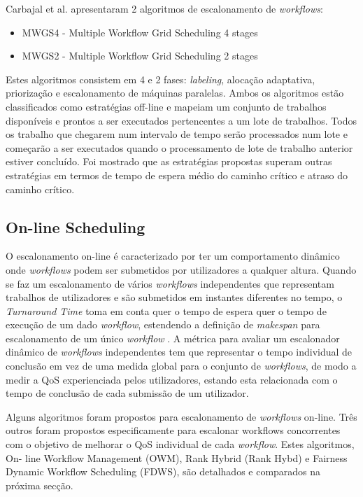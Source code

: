 Carbajal et al. \cite{Hirales-Carbajal2012} apresentaram 2 algoritmos de escalonamento de \textit{workflows}:
\begin{itemize}
	\item MWGS4	- Multiple Workflow Grid Scheduling 4 stages
	\item MWGS2 - Multiple Workflow Grid Scheduling 2 stages
\end{itemize} 
Estes algoritmos consistem em 4 e 2 fases: \textit{labeling}, alocação adaptativa, priorização e escalonamento de máquinas paralelas. Ambos os algoritmos estão classificados como estratégias off-line e mapeiam um conjunto de trabalhos disponíveis e prontos a ser executados pertencentes a um lote de trabalhos. Todos os trabalho que chegarem num intervalo de tempo serão processados num lote e começarão a ser executados quando o processamento de lote de trabalho anterior estiver concluído. Foi mostrado que as estratégias propostas superam outras estratégias em termos de tempo de espera médio do caminho crítico e atraso do caminho crítico.

\subsection{On-line Scheduling}
O escalonamento on-line é caracterizado por ter um comportamento dinâmico onde \textit{workflows} podem ser submetidos por utilizadores a qualquer altura.
Quando se faz um escalonamento de vários \textit{workflows} independentes que representam trabalhos de utilizadores e são submetidos em instantes diferentes no tempo, o \textit{Turnaround Time} toma em conta quer o tempo de espera quer o tempo de execução de um dado \textit{workflow}, estendendo a definição de \textit{makespan} para escalonamento de um único \textit{workflow} \cite{Kwok1999}. A métrica para avaliar um escalonador dinâmico de \textit{workflows} independentes tem que representar o tempo individual de conclusão em vez de uma medida global para o conjunto de \textit{workflows}, de modo a medir a QoS experienciada pelos utilizadores, estando esta relacionada com o tempo de conclusão de cada submissão de um utilizador.

Alguns algoritmos foram propostos para escalonamento de \textit{workflows} on-line. Três outros foram propostos especificamente para escalonar workflows concorrentes com o objetivo de melhorar o QoS individual de cada \textit{workflow}. Estes algoritmos, On- line Workflow Management (OWM), Rank Hybrid (Rank Hybd) e Fairness Dynamic Workflow Scheduling (FDWS), são detalhados e comparados na próxima secção.

